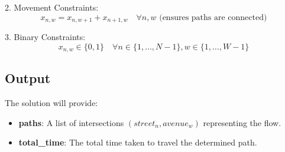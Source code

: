 \documentclass{article}
\begin{document}
2. Movement Constraints:
    \[
    x_{n,w} = x_{n,w+1} + x_{n+1,w} \quad \forall n, w \text{ (ensures paths are connected)}
    \]
    
3. Binary Constraints:
    \[
    x_{n,w} \in \{0, 1\} \quad \forall n \in \{1,\ldots,N-1\}, w \in \{1,\ldots,W-1\}
    \]

\subsection*{Output}
The solution will provide:
\begin{itemize}
    \item \textbf{paths}: A list of intersections \((street_{n}, avenue_{w})\) representing the flow.
    \item \textbf{total\_time}: The total time taken to travel the determined path.
\end{itemize}
\end{document}
